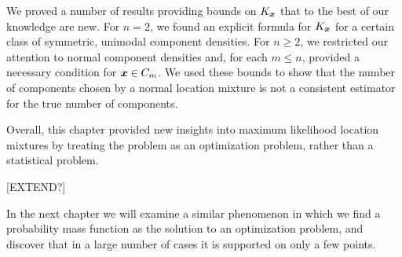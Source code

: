 We proved a number of results providing bounds on $K_{\bm{{x}}}$ that to the best of our knowledge are new. For $n = 2$, we found an explicit formula for $K_{\bm{{x}}}$ for a certain class of symmetric, unimodal component densities. For $n \geq 2$, we restricted our attention to normal component densities and, for each $m \leq n$, provided a necessary condition for ${\bm{{x}}} \in C_m$. We used these bounds to show that the number of components chosen by a normal location mixture is not a consistent estimator for the true number of components. 

Overall, this chapter provided new insights into maximum likelihood location mixtures by treating the problem as an optimization problem, rather than a statistical problem.

[EXTEND?]

In the next chapter we will examine a similar phenomenon in which we find a probability mass function as the solution to an optimization problem, and discover that in a large number of cases it is supported on only a few points.